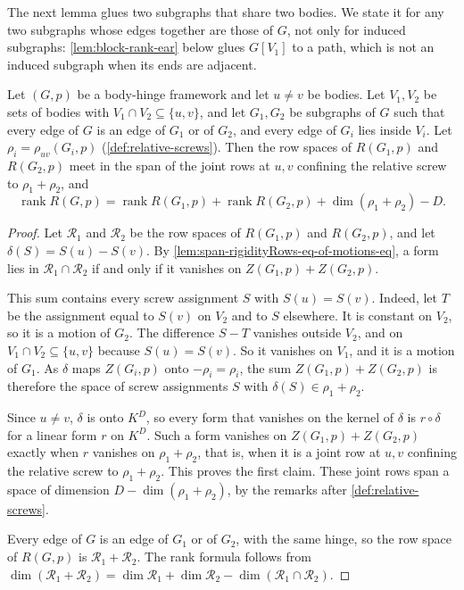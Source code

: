 The next lemma glues two subgraphs that share two bodies. We state it
for any two subgraphs whose edges together are those of $G$, not only
for induced subgraphs: \cref{lem:block-rank-ear} below glues $G[V_1]$ to
a path, which is not an induced subgraph when its ends are adjacent.

\begin{lemma}
  \label{lem:block-rank-two-cut}
  \leanok
  Let $(G,p)$ be a body-hinge framework and let $u \neq v$ be bodies. Let
  $V_1, V_2$ be sets of bodies with $V_1 \cap V_2 \subseteq \{u, v\}$,
  and let $G_1, G_2$ be subgraphs of $G$ such that every edge of $G$ is an
  edge of $G_1$ or of $G_2$, and every edge of $G_i$ lies inside $V_i$.
  Let $\rho_i = \rho_{uv}(G_i, p)$ (\cref{def:relative-screws}). Then the
  row spaces of $R(G_1,p)$ and $R(G_2,p)$ meet in the span of the joint
  rows at $u, v$ confining the relative screw to $\rho_1 + \rho_2$, and
  \[
    \operatorname{rank} R(G,p) = \operatorname{rank} R(G_1,p)
    + \operatorname{rank} R(G_2,p) + \dim(\rho_1 + \rho_2) - D.
  \]
\end{lemma}
\begin{proof}
  \leanok
  Let $\mathcal R_1$ and $\mathcal R_2$ be the row spaces of $R(G_1,p)$
  and $R(G_2,p)$, and let $\delta(S) = S(u) - S(v)$. By
  \cref{lem:span-rigidityRows-eq-of-motions-eq}, a form lies in
  $\mathcal R_1 \cap \mathcal R_2$ if and only if it vanishes on
  $Z(G_1,p) + Z(G_2,p)$.

  This sum contains every screw assignment $S$ with $S(u) = S(v)$.
  Indeed, let $T$ be the assignment equal to $S(v)$ on $V_2$ and to $S$
  elsewhere. It is constant on $V_2$, so it is a motion of $G_2$. The
  difference $S - T$ vanishes outside $V_2$, and on
  $V_1 \cap V_2 \subseteq \{u, v\}$ because $S(u) = S(v)$. So it vanishes
  on $V_1$, and it is a motion of $G_1$. As $\delta$ maps $Z(G_i,p)$
  onto $-\rho_i = \rho_i$, the sum $Z(G_1,p) + Z(G_2,p)$ is therefore the
  space of screw assignments $S$ with $\delta(S) \in \rho_1 + \rho_2$.

  Since $u \neq v$, $\delta$ is onto $K^D$, so every form that vanishes
  on the kernel of $\delta$ is $r \circ \delta$ for a linear form $r$ on
  $K^D$. Such a form vanishes on $Z(G_1,p) + Z(G_2,p)$ exactly when $r$
  vanishes on $\rho_1 + \rho_2$, that is, when it is a joint row at
  $u, v$ confining the relative screw to $\rho_1 + \rho_2$. This proves
  the first claim. These joint rows span a space of dimension
  $D - \dim(\rho_1 + \rho_2)$, by the remarks after
  \cref{def:relative-screws}.

  Every edge of $G$ is an edge of $G_1$ or of $G_2$, with the same hinge,
  so the row space of $R(G,p)$ is $\mathcal R_1 + \mathcal R_2$. The rank
  formula follows from
  $\dim(\mathcal R_1 + \mathcal R_2) = \dim \mathcal R_1
  + \dim \mathcal R_2 - \dim(\mathcal R_1 \cap \mathcal R_2)$.
\end{proof}

